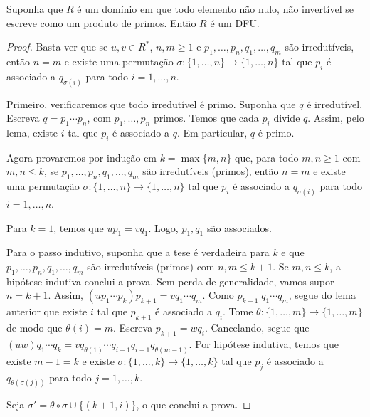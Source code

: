 \begin{prop}
Suponha que $R$ é um domínio em que todo elemento não nulo, não invertível se escreve como um produto de primos.
Então $R$ é um DFU.
\end{prop}
\begin{proof}
    Basta ver que se $u, v \in R^*$, $n, m\geq 1$ e $p_1, \dots, p_n, q_1, \dots, q_m$ são irredutíveis, então $n=m$ e existe uma permutação $\sigma:\{1, \dots, n\}\rightarrow \{1, \dots, n\}$ tal que $p_i$ é associado a $q_{\sigma(i)}$ para todo $i=1, \dots, n$.

    Primeiro, verificaremos que todo irredutível é primo.
    Suponha que $q$ é irredutível.
    Escreva $q=p_1\cdots p_n$, com $p_1, \dots, p_n$ primos.
    Temos que cada $p_i$ divide $q$.
    Assim, pelo lema, existe $i$ tal que $p_i$ é associado a $q$.
    Em particular, $q$ é primo.

    Agora provaremos por indução em $k=\max\{m, n\}$ que, para todo $m, n\geq1$ com $m, n\leq k$, se $p_1, \dots, p_n, q_1, \dots, q_m$ são irredutíveis (primos), então $n=m$ e existe uma permutação $\sigma:\{1, \dots, n\}\rightarrow \{1, \dots, n\}$ tal que $p_i$ é associado a $q_{\sigma(i)}$ para todo $i=1, \dots, n$.

    Para $k=1$, temos que $u p_1= v q_1$.
    Logo, $p_1, q_1$ são associados.

    Para o passo indutivo, suponha que a tese é verdadeira para $k$ e que $p_1, \dots, p_n, q_1, \dots, q_m$ são irredutíveis (primos) com $n, m\leq k+1$.
    Se $m, n\leq k$, a hipótese indutiva conclui a prova.
    Sem perda de generalidade, vamos supor $n=k+1$.
    Assim, $(up_1\cdots p_{k})p_{k+1}=vq_1\cdots q_{m}$.
    Como $p_{k+1}|q_1\cdots q_m$, segue do lema anterior que existe $i$ tal que $p_{k+1}$ é associado a $q_i$.
    Tome $\theta: \{1, \dots, m\}\rightarrow \{1, \dots, m\}$ de modo que  $\theta(i)=m$. Escreva $p_{k+1}=w q_i$.
    Cancelando, segue que $(uw)q_1\cdots q_k = vq_{\theta(1)}\cdots q_{i-1}q_{i+1} q_{\theta(m-1)}$.
    Por hipótese indutiva, temos que existe $m-1=k$ e existe $\sigma: \{1, \dots, k\}\rightarrow \{1, \dots, k\}$ tal que $p_j$ é associado a $q_{\theta(\sigma(j))}$ para todo $j=1, \dots, k$.

    Seja $\sigma'=\theta\circ\sigma \cup \{(k+1, i)\}$, o que conclui a prova.
\end{proof}

